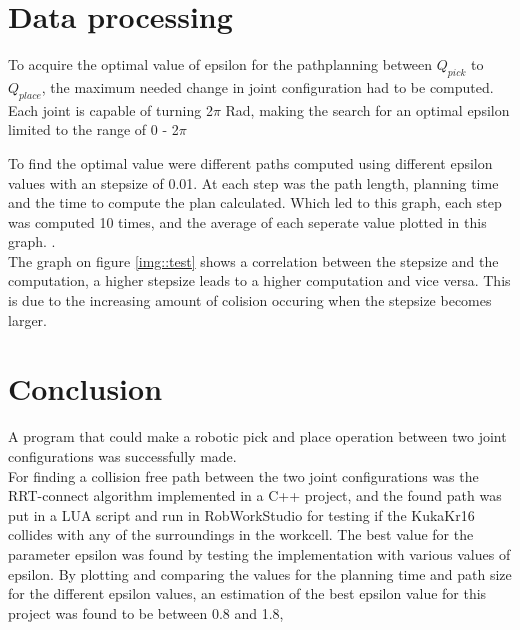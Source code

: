 \documentclass[11pt]{article}
\begin{document}
\section{Data processing}
To acquire the optimal value of epsilon for the pathplanning between $Q_{pick}$ to $Q_{place}$,  the maximum needed change in joint configuration had to be computed. Each joint is capable of turning 2$\pi$ Rad, making the search for an optimal epsilon limited to the range of 0 - 2$\pi$
 
 
\noindent To find the optimal value were different paths computed using different epsilon values with an stepsize of 0.01.  At each step was the path length, planning time  and the time to compute the plan calculated.   Which led to this graph, each step was computed 10 times, and the average of each seperate value plotted in this graph. .\\[0.2cm]



\noindent The graph on figure \ref{img::test} shows a  correlation between the stepsize and the computation, a higher stepsize leads to a higher computation and vice versa.  This is due to the increasing amount of colision occuring when the stepsize becomes larger.  


\newpage
\section{Conclusion}
A program that could make a robotic pick and place operation between two joint configurations was successfully made.\\[0.2cm]


\noindent For finding a collision free path between the two joint configurations was the RRT-connect algorithm implemented in a C++ project, and the found path was put in a LUA script and run in RobWorkStudio for testing if the KukaKr16 collides with any of the surroundings in the workcell. The best value for the parameter epsilon was found by testing the implementation with various values of epsilon. By plotting and comparing the values for the planning time and path size for the different epsilon values, an estimation of the best epsilon value for this project was found to be between 0.8 and 1.8,
\end{document}
